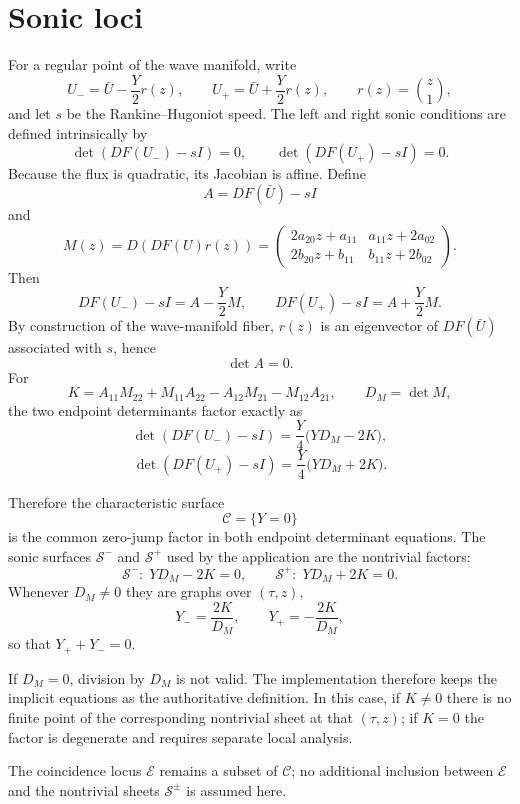 \section{Sonic loci}

For a regular point of the wave manifold, write
\[
U_- = \bar U-\frac{Y}{2}r(z),
\qquad
U_+ = \bar U+\frac{Y}{2}r(z),
\qquad
r(z)=\binom{z}{1},
\]
and let $s$ be the Rankine--Hugoniot speed.  The left and right sonic
conditions are defined intrinsically by
\[
\boxed{\det\!\left(DF(U_-)-sI\right)=0},
\qquad
\boxed{\det\!\left(DF(U_+)-sI\right)=0}.
\]
Because the flux is quadratic, its Jacobian is affine.  Define
\[
A=DF(\bar U)-sI
\]
and
\[
M(z)=D\!\left(DF(U)r(z)\right)
 =
\begin{pmatrix}
2a_{20}z+a_{11} & a_{11}z+2a_{02}\\
2b_{20}z+b_{11} & b_{11}z+2b_{02}
\end{pmatrix}.
\]
Then
\[
DF(U_-)-sI=A-\frac{Y}{2}M,
\qquad
DF(U_+)-sI=A+\frac{Y}{2}M.
\]
By construction of the wave-manifold fiber, $r(z)$ is an eigenvector of
$DF(\bar U)$ associated with $s$, hence
\[
\det A=0.
\]
For
\[
K=A_{11}M_{22}+M_{11}A_{22}-A_{12}M_{21}-M_{12}A_{21},
\qquad D_M=\det M,
\]
the two endpoint determinants factor exactly as
\[
\boxed{
\det(DF(U_-)-sI)=\frac{Y}{4}\bigl(YD_M-2K\bigr)
},
\]
\[
\boxed{
\det(DF(U_+)-sI)=\frac{Y}{4}\bigl(YD_M+2K\bigr)
}.
\]

Therefore the characteristic surface
\[
\mathcal C=\{Y=0\}
\]
is the common zero-jump factor in both endpoint determinant equations.
The sonic surfaces $\mathcal S^-$ and $\mathcal S^+$ used by the application
are the nontrivial factors:
\[
\boxed{\mathcal S^-:\;YD_M-2K=0},
\qquad
\boxed{\mathcal S^+:\;YD_M+2K=0}.
\]
Whenever $D_M\neq0$ they are graphs over $(\tau,z)$,
\[
Y_-=\frac{2K}{D_M},
\qquad
Y_+=-\frac{2K}{D_M},
\]
so that $Y_++Y_-=0$.

If $D_M=0$, division by $D_M$ is not valid.  The implementation therefore
keeps the implicit equations as the authoritative definition.  In this
case, if $K\neq0$ there is no finite point of the corresponding nontrivial
sheet at that $(\tau,z)$; if $K=0$ the factor is degenerate and requires
separate local analysis.

The coincidence locus $\mathcal E$ remains a subset of $\mathcal C$; no
additional inclusion between $\mathcal E$ and the nontrivial sheets
$\mathcal S^\pm$ is assumed here.

